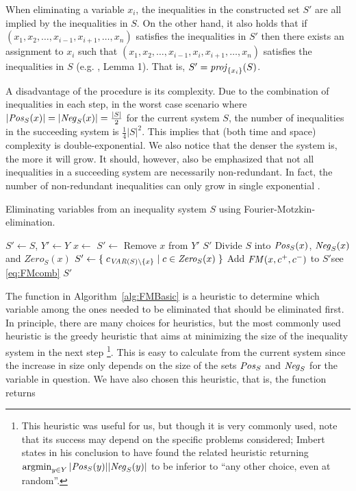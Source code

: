 When eliminating a variable $x_i$, the inequalities in the constructed set $S'$ are all implied by the inequalities in $S$. On the other hand, it also holds that if $(x_1, x_2, \ldots, x_{i-1}, x_{i+1}, \ldots, x_n)$ satisfies the inequalities in $S'$ then there exists an assignment to $x_i$ such that $(x_1, x_2, \ldots, x_{i-1}, x_i, x_{i+1}, \ldots, x_n)$ satisfies the inequalities in $S$ {(e.g. \cite{duffin74}, Lemma 1)}. That is, $S' = \mathit{proj}_{\{x_i\}}(S)$.

A disadvantage of the procedure is its complexity. Due to the combination of inequalities in each step, in the worst case scenario where $|\mathit{Pos}_S(x)| = |\mathit{Neg}_S(x)| = \frac{|S|}{2}$ for the current system $S$, the number of inequalities in the succeeding system is $\frac{1}{4}|S|^2$. This implies that (both time and space) complexity is double-exponential.  
We also notice that the denser the system is, the more it will grow. 
It should, however, also be emphasized that not all inequalities in a succeeding system are necessarily non-redundant. In fact, the
number of non-redundant inequalities can only grow in single exponential \cite{Monniaux10}.
%
\begin{algorithm}
\caption{Eliminating variables from an inequality system $S$ using Fourier-Motzkin-elimination.}\label{alg:FMBasic}
\begin{algorithmic}[1]
	\State  $S'\gets S$, $Y'\gets Y$
		\State $x\gets$ 
		\State $S' \gets$ 
		\State Remove $x$ from $Y'$
	\EndWhile
	\State \Return $S'$
\EndFunction
\Statex
{}
\State Divide $S$ into $\mathit{Pos}_S(x)$, $\mathit{Neg}_S(x)$ and $\mathit{Zero}_S(x)$
\State $S'\gets \{\;{c_{\mathit{VAR}(S)\setminus\{x\}}}\;|\;{c\in\mathit{Zero}_S(x)}\;\}$ 
		\State Add $\mathit{FM}(x,c^+, c^-)$ to $S'$\Comment see \eqref{eq:FMcomb}
	\EndFor
\EndFor
\State \Return $S'$
\EndFunction
\end{algorithmic}
\end{algorithm}
%
The function  in Algorithm~\ref{alg:FMBasic} is a heuristic to determine which variable among the ones needed to be eliminated that should be eliminated first. In principle, there are many choices for heuristics, but the most commonly used heuristic is the greedy heuristic that aims at minimizing the size of the inequality system in the next step \cite{duffin74}\footnote{This heuristic was useful for us, but though it is very commonly used, note that its success may depend on the specific problems considered; Imbert \cite{imbert93} states in his conclusion to have found the related heuristic returning $\argmin_{y\in Y}|\Pos_S(y)||\Neg_S(y)|$ to be inferior to ``any other choice, even at random''.}. This is easy to calculate from the current system since the increase in size only depends on the size of the sets $\mathit{Pos}_S$ and $\mathit{Neg}_S$ for the variable in question. We have also chosen this heuristic, that is, the function  returns 
